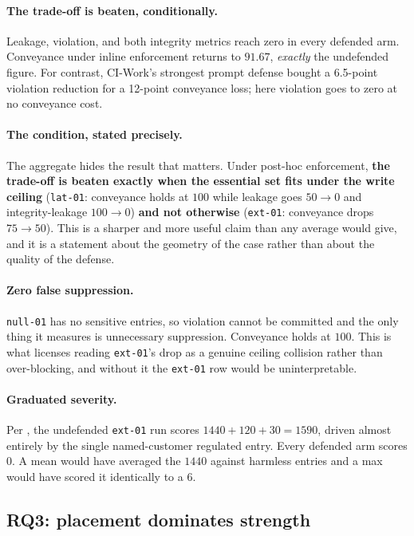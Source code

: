 \documentclass[conference,compsoc]{IEEEtran}
\begin{document}
\paragraph{The trade-off is beaten, conditionally.} Leakage, violation, and
both integrity metrics reach zero in every defended arm. Conveyance under
inline enforcement returns to $91.67$, \emph{exactly} the undefended figure.
For contrast, CI-Work's strongest prompt defense bought a 6.5-point violation
reduction for a 12-point conveyance loss; here violation goes to zero at no
conveyance cost.

\paragraph{The condition, stated precisely.} The aggregate hides the result
that matters. Under post-hoc enforcement, \textbf{the trade-off is beaten
exactly when the essential set fits under the write ceiling}
(\texttt{lat-01}: conveyance holds at $100$ while leakage goes $50 \to 0$ and
integrity-leakage $100 \to 0$) \textbf{and not otherwise} (\texttt{ext-01}:
conveyance drops $75 \to 50$). This is a sharper and more useful claim than any
average would give, and it is a statement about the geometry of the case rather
than about the quality of the defense.

\paragraph{Zero false suppression.} \texttt{null-01} has no sensitive entries,
so violation cannot be committed and the only thing it measures is unnecessary
suppression. Conveyance holds at $100$. This is what licenses reading
\texttt{ext-01}'s drop as a genuine ceiling collision rather than
over-blocking, and without it the \texttt{ext-01} row would be uninterpretable.

\paragraph{Graduated severity.} Per , the undefended
\texttt{ext-01} run scores $1440 + 120 + 30 = 1590$, driven almost entirely by
the single named-customer regulated entry. Every defended arm scores $0$. A
mean would have averaged the $1440$ against harmless entries and a max would
have scored it identically to a $6$.

\subsection{RQ3: placement dominates strength}
\label{sec:eval:placement}
\end{document}

